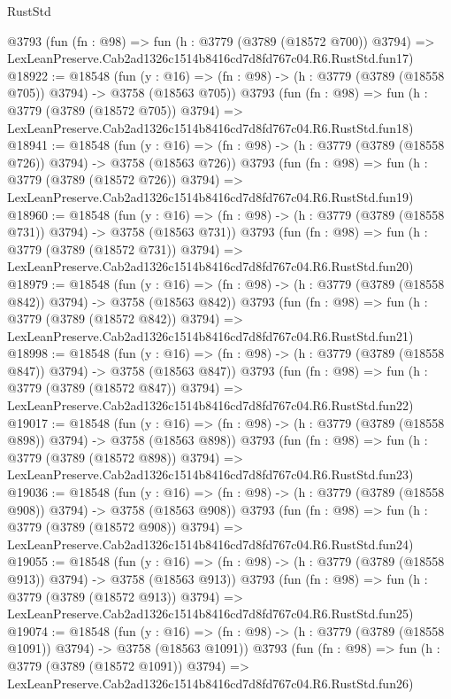 \begin{lexlean}{RustStd}
\begin{coremodule}
    @3793
    (fun (fn : @98) =>
    fun (h : @3779 (@3789 (@18572 @700)) @3794) =>
    LexLeanPreserve.Cab2ad1326c1514b8416cd7d8fd767c04.R6.RustStd.fun17)
@18922 := @18548
    (fun (y : @16) => (fn : @98) -> (h : @3779 (@3789 (@18558 @705)) @3794) -> @3758 (@18563 @705))
    @3793
    (fun (fn : @98) =>
    fun (h : @3779 (@3789 (@18572 @705)) @3794) =>
    LexLeanPreserve.Cab2ad1326c1514b8416cd7d8fd767c04.R6.RustStd.fun18)
@18941 := @18548
    (fun (y : @16) => (fn : @98) -> (h : @3779 (@3789 (@18558 @726)) @3794) -> @3758 (@18563 @726))
    @3793
    (fun (fn : @98) =>
    fun (h : @3779 (@3789 (@18572 @726)) @3794) =>
    LexLeanPreserve.Cab2ad1326c1514b8416cd7d8fd767c04.R6.RustStd.fun19)
@18960 := @18548
    (fun (y : @16) => (fn : @98) -> (h : @3779 (@3789 (@18558 @731)) @3794) -> @3758 (@18563 @731))
    @3793
    (fun (fn : @98) =>
    fun (h : @3779 (@3789 (@18572 @731)) @3794) =>
    LexLeanPreserve.Cab2ad1326c1514b8416cd7d8fd767c04.R6.RustStd.fun20)
@18979 := @18548
    (fun (y : @16) => (fn : @98) -> (h : @3779 (@3789 (@18558 @842)) @3794) -> @3758 (@18563 @842))
    @3793
    (fun (fn : @98) =>
    fun (h : @3779 (@3789 (@18572 @842)) @3794) =>
    LexLeanPreserve.Cab2ad1326c1514b8416cd7d8fd767c04.R6.RustStd.fun21)
@18998 := @18548
    (fun (y : @16) => (fn : @98) -> (h : @3779 (@3789 (@18558 @847)) @3794) -> @3758 (@18563 @847))
    @3793
    (fun (fn : @98) =>
    fun (h : @3779 (@3789 (@18572 @847)) @3794) =>
    LexLeanPreserve.Cab2ad1326c1514b8416cd7d8fd767c04.R6.RustStd.fun22)
@19017 := @18548
    (fun (y : @16) => (fn : @98) -> (h : @3779 (@3789 (@18558 @898)) @3794) -> @3758 (@18563 @898))
    @3793
    (fun (fn : @98) =>
    fun (h : @3779 (@3789 (@18572 @898)) @3794) =>
    LexLeanPreserve.Cab2ad1326c1514b8416cd7d8fd767c04.R6.RustStd.fun23)
@19036 := @18548
    (fun (y : @16) => (fn : @98) -> (h : @3779 (@3789 (@18558 @908)) @3794) -> @3758 (@18563 @908))
    @3793
    (fun (fn : @98) =>
    fun (h : @3779 (@3789 (@18572 @908)) @3794) =>
    LexLeanPreserve.Cab2ad1326c1514b8416cd7d8fd767c04.R6.RustStd.fun24)
@19055 := @18548
    (fun (y : @16) => (fn : @98) -> (h : @3779 (@3789 (@18558 @913)) @3794) -> @3758 (@18563 @913))
    @3793
    (fun (fn : @98) =>
    fun (h : @3779 (@3789 (@18572 @913)) @3794) =>
    LexLeanPreserve.Cab2ad1326c1514b8416cd7d8fd767c04.R6.RustStd.fun25)
@19074 := @18548
    (fun (y : @16) =>
    (fn : @98) -> (h : @3779 (@3789 (@18558 @1091)) @3794) -> @3758 (@18563 @1091))
    @3793
    (fun (fn : @98) =>
    fun (h : @3779 (@3789 (@18572 @1091)) @3794) =>
    LexLeanPreserve.Cab2ad1326c1514b8416cd7d8fd767c04.R6.RustStd.fun26)

\end{coremodule}
\end{lexlean}
